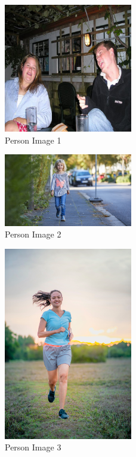\begin{figure}[h]
   \centering
   \includegraphics[width=0.5\textwidth]{../test-pictures/person/person1.jpg}
   \caption{Person Image 1}
   \label{fig:person1}
\end{figure}

\begin{figure}[h]
   \centering
   \includegraphics[width=0.5\textwidth]{../test-pictures/person/person2.jpg}
   \caption{Person Image 2}
   \label{fig:person2}
\end{figure}

\begin{figure}[h]
   \centering
   \includegraphics[width=0.5\textwidth]{../test-pictures/person/person3.jpg}
   \caption{Person Image 3}
   \label{fig:person3}
\end{figure}

